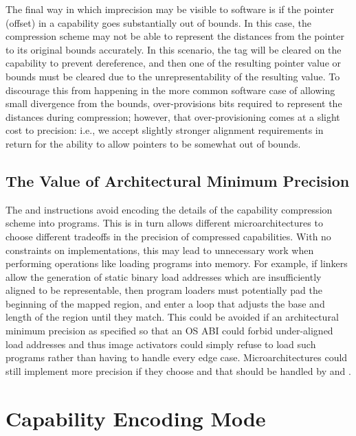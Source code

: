 The final way in which imprecision may be visible to software is if the
pointer (offset) in a capability goes substantially out of bounds.
In this case, the compression scheme may not be able to represent the
distances from the pointer to its original bounds accurately.
In this scenario, the tag will be cleared on the capability to prevent
dereference, and then one of the resulting pointer value or bounds must be
cleared due to the unrepresentability of the resulting value.
To discourage this from happening in the more common software case of allowing
small divergence from the bounds,  over-provisions
bits required to represent the distances during compression; however, that
over-provisioning comes at a slight cost to precision: i.e., we accept slightly
stronger alignment requirements in return for the ability to allow pointers to
be somewhat out of bounds.

\subsection{The Value of Architectural Minimum Precision}
\label{sec:the-value-of-architectural-minimum-precision}

The  and
 instructions avoid encoding the details of
the capability compression scheme into programs.
This is in turn allows different microarchitectures to choose different
tradeoffs in the precision of compressed capabilities.
With no constraints on implementations, this may lead to unnecessary work
when performing operations like loading programs into memory.
For example, if linkers allow the generation of static binary load addresses
which are insufficiently aligned to be representable, then program loaders
must potentially pad the beginning of the mapped region, and enter a loop
that adjusts the base and length of the region until they match.
This could be avoided if an architectural minimum precision as specified so
that an OS ABI could forbid under-aligned load addresses and thus
image activators could simply refuse to load such programs rather than having
to handle every edge case.
Microarchitectures could still implement more precision if they choose and
that should be handled by  and
.

\section{Capability Encoding Mode}
\label{section:capability-encoding-mode}

